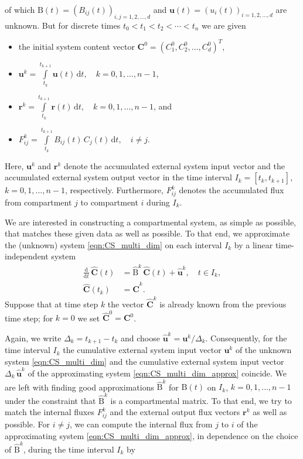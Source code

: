 \documentclass[draft]{agujournal2019}
\renewcommand{\vec}[1]{\mathbf{#1}}
\newcommand{\tens}[1]{\mathrm{#1}}
\newcommand{\deriv}[1]{\frac{\mathrm{d}}{\mathrm{d}#1}}
\newcommand{\dd}[1]{\,\mathrm{d}#1}
\newcommand{\intl}{\int\limits}
\begin{document}
        of which $\tens{B}(t)=(B_{ij}(t))_{i,j=1,2,\ldots,d}$ and $\vec{u}(t)=(u_i(t))_{i=1,2,\ldots,d}$ are unknown.
        But for discrete times $t_0<t_1<t_2<\cdots<t_n$ we are given
        \begin{itemize}
            \item the initial system content vector $\vec{C}^0=(C^0_1,C^0_2,\ldots,C^0_d)^T$,
            \item $\vec{u}^k = \intl_{t_k}^{t_{k+1}} \vec{u}(t)\dd{t},\quad k=0,1,\ldots,n-1$, 
            \item $\vec{r}^k = \intl_{t_k}^{t_{k+1}} \vec{r}(t)\dd{t},\quad k=0,1,\ldots,n-1$, and
            \item $F_{ij}^k = \intl_{t_k}^{t_{k+1}} B_{ij}(t)\,C_j(t)\dd{t},\quad i\neq j$.
        \end{itemize}
        Here, $\vec{u}^k$ and $\vec{r}^k$ denote the accumulated external system input vector and the accumulated external system output vector in the time interval $I_k=[t_k,t_{k+1}]$, $k=0,1,\ldots,n-1$, respectively.
        Furthermore, $F^k_{ij}$ denotes the accumulated flux from compartment $j$ to compartment $i$ during $I_k$.

        We are interested in constructing a compartmental system, as simple as possible, that matches these given data as well as possible.
        To that end, we approximate the (unknown) system \eqref{eqn:CS_multi_dim} on each interval $I_k$ by a linear time-independent system
        \begin{equation}\label{eqn:CS_multi_dim_approx}
            \begin{aligned}
                \deriv{t}\,\widehat{\vec{C}}(t) &= \widehat{\tens{B}}^k\,\widehat{\vec{C}}(t) + \widehat{\vec{u}}^k,\quad t\in I_k,\\
                \widehat{\vec{C}}(t_k) &= \widehat{\vec{C}}^k.
            \end{aligned}
        \end{equation}
        Suppose that at time step $k$ the vector $\widehat{\vec{C}}^k$ is already known from the previous time step; for $k=0$ we set $\widehat{\vec{C}}^0=\vec{C}^0$.

        Again, we write $\Delta_k=t_{k+1}-t_k$ and choose $\widehat{\vec{u}}^k=\vec{u}^k/\Delta_k$.
        Consequently, for the time interval $I_k$ the cumulative external system input vector $\vec{u}^k$ of the unknown system \eqref{eqn:CS_multi_dim} and the cumulative external system input vector $\Delta_k\,\widehat{\vec{u}}^k$ of the approximating system \eqref{eqn:CS_multi_dim_approx} coincide.
        We are left with finding good approximations $\widehat{\tens{B}}^k$ for $\tens{B}(t)$ on $I_k$, $k=0,1,\ldots,n-1$ under the constraint that $\widehat{\tens{B}}^k$ is a compartmental matrix.
        To that end, we try to match the internal fluxes $F^k_{ij}$ and the external output flux vectors $\vec{r}^k$ as well as possible.
        For $i\neq j$, we can compute the internal flux from $j$ to $i$ of the approximating system \eqref{eqn:CS_multi_dim_approx}, in dependence on the choice of $\widehat{\tens{B}}^k$, during the time interval $I_k$ by
        
\end{document}
